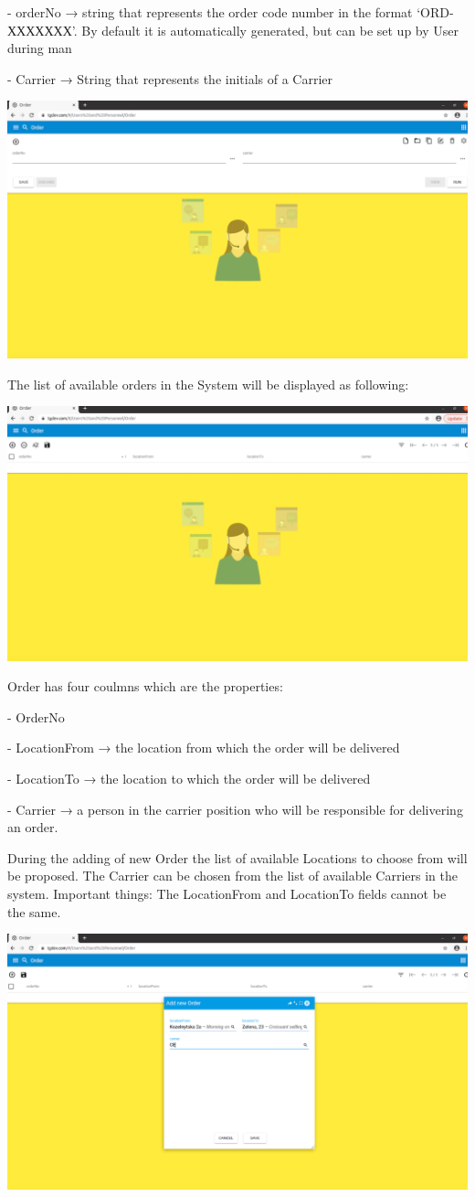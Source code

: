 - orderNo → string that represents the order code number in the format ‘ORD-ХХХХХХХ’. By default it is automatically generated, but can be set up by User during man

- Carrier → String that represents the initials of a  Carrier

\includegraphics[width=\textwidth]{sections/01-chapter/images/order2.png}

The list of available orders in the System will be displayed as following:

\includegraphics[width=\textwidth]{sections/01-chapter/images/order3.png}

Order has four coulmns which are the properties:

- OrderNo

- LocationFrom → the location from which the order will be delivered

- LocationTo → the location to which the order will be delivered

- Carrier → a person in the carrier position who will be responsible for delivering an order.

During the adding of new Order the list of available Locations to choose from will be proposed. The Carrier can be chosen from the list of available Carriers in the system.
Important things: The LocationFrom and LocationTo fields cannot be the same.

\includegraphics[width=\textwidth]{sections/01-chapter/images/order4.png}

